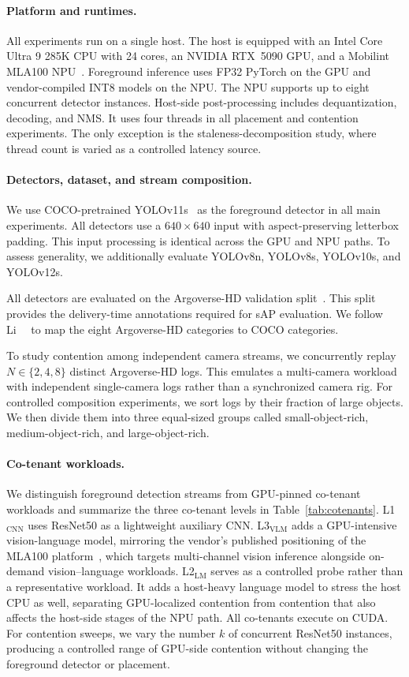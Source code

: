 \documentclass[runningheads]{llncs}
\newcommand{\Lcnn}{L1$_{\text{CNN}}$}
\newcommand{\Llm}{L2$_{\text{LM}}$}
\newcommand{\Lvlm}{L3$_{\text{VLM}}$}
\begin{document}
\paragraph{\textbf{Platform and runtimes.}}
All experiments run on a single host. The host is equipped with an Intel Core Ultra 9 285K CPU with 24 cores, an NVIDIA RTX~5090 GPU, and a Mobilint MLA100 NPU~\cite{mobilint-aries}. Foreground inference uses FP32 PyTorch on the GPU and vendor-compiled INT8 models on the NPU. The NPU supports up to eight concurrent detector instances. Host-side post-processing includes dequantization, decoding, and NMS. It uses four threads in all placement and contention experiments. The only exception is the staleness-decomposition study, where thread count is varied as a controlled latency source.

\paragraph{\textbf{Detectors, dataset, and stream composition.}}
We use COCO-pretrained YOLOv11s~\cite{yolov11} as the foreground detector in all main experiments. All detectors use a $640\times640$ input with aspect-preserving letterbox padding. This input processing is identical across the GPU and NPU paths. To assess generality, we additionally evaluate YOLOv8n, YOLOv8s, YOLOv10s, and YOLOv12s.

All detectors are evaluated on the Argoverse-HD validation split~\cite{streaming-perception}. This split provides the delivery-time annotations required for sAP evaluation. We follow Li~\etal~\cite{streaming-perception} to map the eight Argoverse-HD categories to COCO categories.

To study contention among independent camera streams, we concurrently replay $N \in \{2,4,8\}$ distinct Argoverse-HD logs. This emulates a multi-camera workload with independent single-camera logs rather than a synchronized camera rig. For controlled composition experiments, we sort logs by their fraction of large objects. We then divide them into three equal-sized groups called small-object-rich, medium-object-rich, and large-object-rich.

\paragraph{\textbf{Co-tenant workloads.}}
We distinguish foreground detection streams from GPU-pinned co-tenant workloads and summarize the three co-tenant levels in Table~\ref{tab:cotenants}. \Lcnn{} uses ResNet50 as a lightweight auxiliary CNN. \Lvlm{} adds a GPU-intensive vision-language model, mirroring the vendor's published positioning of the MLA100 platform~\cite{mobilint-aries}, which targets multi-channel vision inference alongside on-demand vision--language workloads. \Llm{} serves as a controlled probe rather than a representative workload. It adds a host-heavy language model to stress the host CPU as well, separating GPU-localized contention from contention that also affects the host-side stages of the NPU path. All co-tenants execute on CUDA. For contention sweeps, we vary the number $k$ of concurrent ResNet50 instances, producing a controlled range of GPU-side contention without changing the foreground detector or placement.
\end{document}
